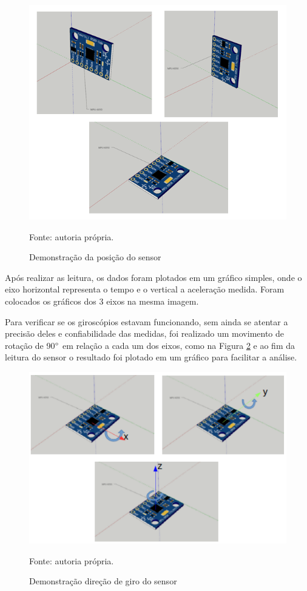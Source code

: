 	\begin{figure}[h]
		\centering
		\includegraphics[keepaspectratio=true,scale=0.8]{figuras/validacao_acel.PNG}
		\caption{Demonstração da posição do sensor}
		Fonte: autoria própria. 
		\label{acel_validation}	
	\end{figure}
	
	Após realizar as leitura, os dados foram plotados em um gráfico simples, onde o eixo horizontal representa o tempo e o vertical a aceleração medida. Foram colocados os gráficos dos 3 eixos na mesma imagem. 
	
	Para verificar se os giroscópios estavam funcionando, sem ainda se atentar a precisão deles e confiabilidade das medidas, foi realizado um movimento de rotação de 90$ \degree $ em relação a cada um dos eixos, como na Figura \ref{validacao_giro}  e ao fim da leitura do sensor o resultado foi plotado em um gráfico para facilitar a análise.
	
	\begin{figure}[h]
		\centering
		\includegraphics[keepaspectratio=true,scale=0.55]{figuras/validacao_giro.png}
		\caption{Demonstração direção de giro do sensor}
		Fonte: autoria própria. 
		\label{validacao_giro}	
	\end{figure}
	
